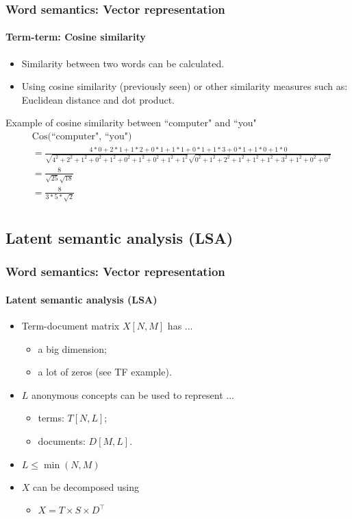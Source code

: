 \documentclass[xcolor=table]{beamer}
\begin{document}
\begin{frame}
\frametitle{Word semantics: Vector representation}
\framesubtitle{Term-term: Cosine similarity}

\begin{itemize}
	\item Similarity between two words can be calculated.
	\item Using cosine similarity (previously seen) or other similarity measures such as: Euclidean distance and dot product.
\end{itemize}

\begin{exampleblock}{Example of cosine similarity between ``computer" and ``you"}
	\fontsize{6}{16}\selectfont\bfseries\boldmath
	\begin{align*}
	& \text{Cos(``computer", ``you")} \\ 
	& = \frac{4*0 + 2*1 + 1*2 + 0*1 + 1*1 + 0*1 + 1*3 + 0*1 + 1*0 + 1*0}{\sqrt{4^2 + 2^2 + 1^2 + 0^2 + 1^2 + 0^2 + 1^2 + 0^2 + 1^2 + 1^2} \sqrt{0^2 + 1^2 + 2^2 + 1^2 + 1^2 + 1^2 + 3^2 + 1^2 + 0^2 + 0^2}}\\
	& = \frac{8}{\sqrt{25}\sqrt{18}}\\
	& = \frac{8}{3*5*\sqrt{2}}\\
	\end{align*}
\end{exampleblock}

\end{frame}

\subsection{Latent semantic analysis (LSA)}

\begin{frame}
\frametitle{Word semantics: Vector representation}
\framesubtitle{Latent semantic analysis (LSA)}

\begin{itemize}
	\item Term-document matrix $X[N, M]$ has ...
	\begin{itemize}
		\item a big dimension;
		\item a lot of zeros (see TF example).
	\end{itemize}
	\item $L$ anonymous concepts can be used to represent ...
	\begin{itemize}
		\item terms: $T[N, L]$;
		\item documents: $D[M, L]$.
	\end{itemize}
	\item $L \le \min(N, M)$
	\item $X$ can be decomposed using 
	\begin{itemize}
		\item $X = T \times S \times D^\top$
	\end{itemize}
\end{itemize}

\end{frame}
\end{document}
